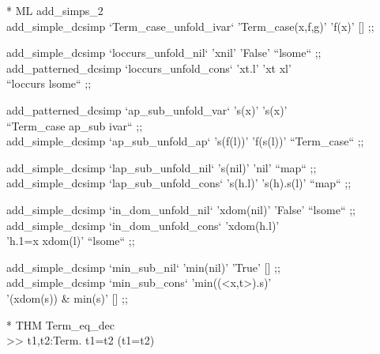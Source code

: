 \begin{prl*}
\>* ML add\_simps\_2\\
\>  add\_simple\_dcsimp `Term\_case\_unfold\_ivar` 'Term\_case(x,f,g)' 'f(x)' [] ;;
\end{prl*}

\begin{prl*}
\>  add\_simple\_dcsimp `loccurs\_unfold\_nil` 'x\mepsilon{}nil' 'False' ``lsome`` ;;\\
\>  add\_patterned\_dcsimp `loccurs\_unfold\_cons` 'x\mepsilon{}t.l' 'x\mepsilon{}t \mvee{} x\mepsilon{}l'\\
\>    ``loccurs lsome`` ;;
\end{prl*}

\begin{prl*}
\>  add\_patterned\_dcsimp `ap\_sub\_unfold\_var` 's(x)' 's(x)' \\
\>    ``Term\_case ap\_sub ivar`` ;;\\
\>  add\_simple\_dcsimp `ap\_sub\_unfold\_ap` 's(f(l))' 'f(s(l))' ``Term\_case`` ;;
\end{prl*}

\begin{prl*}
\>  add\_simple\_dcsimp `lap\_sub\_unfold\_nil` 's(nil)' 'nil' ``map`` ;;\\
\>  add\_simple\_dcsimp `lap\_sub\_unfold\_cons` 's(h.l)' 's(h).s(l)' ``map`` ;;
\end{prl*}

\begin{prl*}
\>  add\_simple\_dcsimp `in\_dom\_unfold\_nil` 'x\mepsilon{}dom(nil)' 'False' ``lsome`` ;;\\
\>  add\_simple\_dcsimp `in\_dom\_unfold\_cons` 'x\mepsilon{}dom(h.l)'\\
\>    'h.1=x \mvee{} x\mepsilon{}dom(l)' ``lsome`` ;;
\end{prl*}

\begin{prl*}
\>  add\_simple\_dcsimp `min\_sub\_nil` 'min(nil)' 'True' [] ;;\\
\>  add\_simple\_dcsimp `min\_sub\_cons` 'min((<x,t>).s)' \\
\>    '\mneg{}(x\mepsilon{}dom(s)) \& min(s)' [] ;;
\end{prl*}

\begin{prl*}
\>* THM Term\_eq\_dec\\
\>  >> \mforall{}t1,t2:Term. t1=t2 \mvee{} \mneg{}(t1=t2)
\end{prl*}

